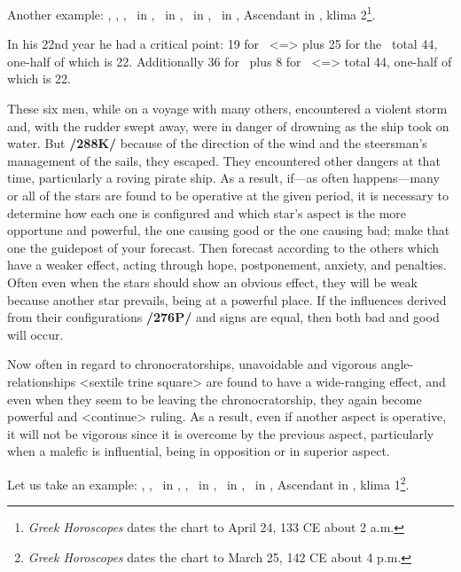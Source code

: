 Another example: \Sun, \Mercury, \Venus, \Moon\, in \Taurus, \Saturn\, in \Sagittarius, \Jupiter\, in \Scorpio, \Mars\, in \Leo, Ascendant in \Pisces, klima 2\footnote{\textit{Greek Horoscopes} dates the chart to  April 24, 133 CE about 2 a.m.}.

In his 22nd year he had a critical point: 19 for \Leo\, <=\Sun> plus 25 for the \Moon\, total 44, one-half of which is 22. Additionally 36 for \Scorpio\, plus 8 for \Taurus\, <=\Venus> total 44, one-half of which is 22.

These six men, while on a voyage with many others, encountered a violent storm and, with the rudder swept away, were in danger of drowning as the ship took on water. But \textbf{/288K/} because of the direction of the wind and the steersman’s management of the sails, they escaped. They encountered other dangers at that time, particularly a roving pirate ship. As a result, if—as often happens—many or all of the stars are found to be operative at the given period,
it is necessary to determine how each one is configured and which star’s aspect is the more opportune and powerful, the one causing good or the one causing bad; make that one the guidepost of your forecast. Then forecast according to the others which have a weaker effect, acting through hope, postponement, anxiety, and penalties.  Often even when the stars should show an obvious effect, they will be weak because another star prevails, being at a powerful place. If the influences derived from their configurations \textbf{/276P/} and signs are equal, then both bad and good will occur. 

Now often in regard to chronocratorships, unavoidable and vigorous angle-relationships <sextile trine square> are found to have a wide-ranging effect, and even when they seem to be leaving the chronocratorship, they again become powerful and <continue> ruling. As a result, even if another aspect is operative, it will not be vigorous since it is overcome by the previous aspect, particularly when a malefic is influential, being in opposition or in superior aspect.

Let us take an example: \Sun, \Saturn, \Mercury\, in \Aries, \Moon, \Jupiter\, in \Leo, \Mars\, in \Taurus, \Venus\, in \Aquarius, Ascendant in \Virgo, klima 1\footnote{\textit{Greek Horoscopes} dates the chart to March 25, 142 CE about 4 p.m.}.

